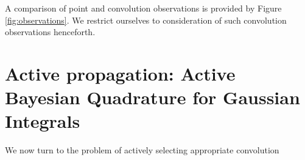 \documentclass[twoside]{article}
\begin{document}
A comparison of point and convolution observations is provided by Figure \ref{fig:observations}. 
We restrict ourselves to consideration of such convolution observations henceforth.


\section{Active propagation: Active Bayesian Quadrature for Gaussian Integrals}

We now turn to the problem of actively selecting appropriate convolution 



\end{document}
